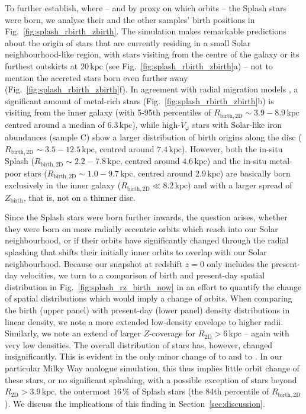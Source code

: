 \documentclass[fleqn,usenatbib]{mnras}
\begin{document}
To further establish, where -- and by proxy on which orbits -- the Splash stars were born, we analyse their and the other samples' birth positions in Fig.~\ref{fig:splash_rbirth_zbirth}. The simulation makes remarkable predictions about the origin of stars that are currently residing in a small Solar neighbourhood-like region, with stars visiting from the centre of the galaxy or its furthest outskirts at $20\,\mathrm{kpc}$ (see Fig.~\ref{fig:splash_rbirth_zbirth}a) -- not to mention the accreted stars born even further away (Fig.~\ref{fig:splash_rbirth_zbirth}f). In agreement with radial migration models \citep[for example][]{Frankel2018, Frankel2020}, a significant amount of metal-rich stars (Fig.~\ref{fig:splash_rbirth_zbirth}b) is visiting from the inner galaxy (with 5-95th percentiles of $R_\mathrm{birth, 2D} \sim 3.9 - 8.9\,\mathrm{kpc}$ centred around a median of $6.3\,\mathrm{kpc}$), while high-$V_\varphi$ stars with Solar-like iron abundances (sample C) show a larger distribution of birth origins along the disc ($R_\mathrm{birth, 2D} \sim 3.5-12.5\,\mathrm{kpc}$, centred around $7.4\,\mathrm{kpc}$). However, both the in-situ Splash ($R_\mathrm{birth, 2D} \sim 2.2-7.8\,\mathrm{kpc}$, centred around $4.6\,\mathrm{kpc}$) and the in-situ metal-poor stars ($R_\mathrm{birth, 2D} \sim 1.0-9.7\,\mathrm{kpc}$, centred around $2.9\,\mathrm{kpc}$) are basically born exclusively in the inner galaxy ($R_\mathrm{birth, 2D} \ll 8.2\,\mathrm{kpc}$) and with a larger spread of $Z_\mathrm{birth}$, that is, not on a thinner disc.

Since the Splash stars were born further inwards, the question arises, whether they were born on more radially eccentric orbits which reach into our Solar neighbourhood, or if their orbits have significantly changed through the radial splashing that shifts their initially inner orbits to overlap with our Solar neighbourhood. Because our snapshot at redshift $z = 0$ only includes the present-day velocities, we turn to a comparison of birth and present-day spatial distribution in Fig.~\ref{fig:splash_rz_birth_now} in an effort to quantify the change of spatial distributions which would imply a change of orbits. When comparing the birth (upper panel) with present-day (lower panel) density distributions in linear density, we note a more extended low-density envelope to higher radii. Similarly, we note an extend of larger $Z$-coverage for $R_\mathrm{2D} > 6\,\mathrm{kpc}$ -- again with very low densities. The overall distribution of stars has, however, changed insignificantly. This is evident in the only minor change of  to  and  to . In our particular Milky Way analogue simulation, this thus implies little orbit change of these stars, or no significant splashing, with a possible exception of stars beyond $R_\mathrm{2D} > 3.9\,\mathrm{kpc}$, the outermost $16\,\mathrm{\%}$ of Splash stars (the 84th percentile of $R_\mathrm{birth,2D}$). We discuss the implications of this finding in Section~\ref{sec:discussion}.
\end{document}
